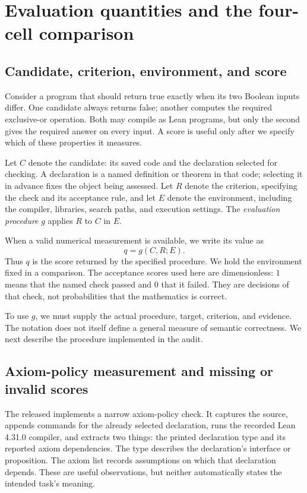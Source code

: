 \section{Evaluation quantities and the four-cell comparison}
\label{sec:framework}

\subsection{Candidate, criterion, environment, and score}
\label{subsec:score}

Consider a program that should return true exactly when its two Boolean inputs differ. One candidate always returns false; another computes the required exclusive-or operation. Both may compile as Lean programs, but only the second gives the required answer on every input. A score is useful only after we specify which of these properties it measures.

Let $C$ denote the candidate: its saved code and the declaration selected for checking. A declaration is a named definition or theorem in that code; selecting it in advance fixes the object being assessed. Let $R$ denote the criterion, specifying the check and its acceptance rule, and let $E$ denote the environment, including the compiler, libraries, search paths, and execution settings. The \emph{evaluation procedure} $g$ applies $R$ to $C$ in $E$.

When a valid numerical measurement is available, we write its value as
\[
q=g(C,R;E).
\]
Thus $q$ is the score returned by the specified procedure. We hold the environment fixed in a comparison. The acceptance scores used here are dimensionless: $1$ means that the named check passed and $0$ that it failed. They are decisions of that check, not probabilities that the mathematics is correct.

To use $g$, we must supply the actual procedure, target, criterion, and evidence. The notation does not itself define a general measure of semantic correctness. We next describe the procedure implemented in the audit.

\subsection{Axiom-policy measurement and missing or invalid scores}
\label{subsec:measurement-status}

The released  implements a narrow axiom-policy
check. It captures the source, appends commands for the already selected
declaration, runs the recorded Lean 4.31.0 compiler, and extracts two things:
the printed declaration type and its reported axiom dependencies. The type
describes the declaration's interface or proposition. The axiom list records
assumptions on which that declaration depends. These are useful observations,
but neither automatically states the intended task's meaning.

